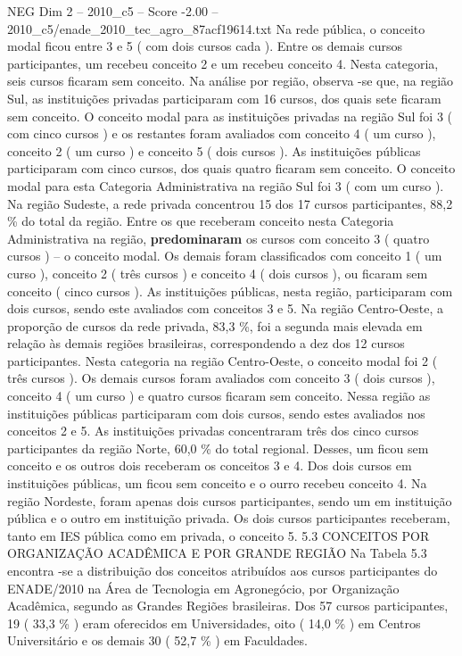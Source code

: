 \begin{textsample}{NEG Dim 2 – 2010\_c5 – Score -2.00 – 2010\_c5/enade\_2010\_tec\_agro\_87acf19614.txt}
Na rede pública, o conceito modal ficou entre 3 e 5 ( com dois cursos cada ).
Entre os demais cursos participantes, um recebeu conceito 2 e um recebeu conceito 4.
Nesta categoria, seis cursos ficaram sem conceito.
Na análise por região, observa -se que, na região Sul, as instituições privadas participaram com 16 cursos, dos quais sete ficaram sem conceito.
O conceito modal para as instituições privadas na região Sul foi 3 ( com cinco cursos ) e os restantes foram avaliados com conceito 4 ( um curso ), conceito 2 ( um curso ) e conceito 5 ( dois cursos ).
As instituições públicas participaram com cinco cursos, dos quais quatro ficaram sem conceito.
O conceito modal para esta Categoria Administrativa na região Sul foi 3 ( com um curso ).
Na região Sudeste, a rede privada concentrou 15 dos 17 cursos participantes, 88,2 \% do total da região.
Entre os que receberam conceito nesta Categoria Administrativa na região, \textbf{predominaram} os cursos com conceito 3 ( quatro cursos ) – o conceito modal.
Os demais foram classificados com conceito 1 ( um curso ), conceito 2 ( três cursos ) e conceito 4 ( dois cursos ), ou ficaram sem conceito ( cinco cursos ).
As instituições públicas, nesta região, participaram com dois cursos, sendo este avaliados com conceitos 3 e 5.
Na região Centro-Oeste, a proporção de cursos da rede privada, 83,3 \%, foi a segunda mais elevada em relação às demais regiões brasileiras, correspondendo a dez dos 12 cursos participantes.
Nesta categoria na região Centro-Oeste, o conceito modal foi 2 ( três cursos ).
Os demais cursos foram avaliados com conceito 3 ( dois cursos ), conceito 4 ( um curso ) e quatro cursos ficaram sem conceito.
Nessa região as instituições públicas participaram com dois cursos, sendo estes avaliados nos conceitos 2 e 5.
As instituições privadas concentraram três dos cinco cursos participantes da região Norte, 60,0 \% do total regional.
Desses, um ficou sem conceito e os outros dois receberam os conceitos 3 e 4.
Dos dois cursos em instituições públicas, um ficou sem conceito e o ourro recebeu conceito 4.
Na região Nordeste, foram apenas dois cursos participantes, sendo um em instituição pública e o outro em instituição privada.
Os dois cursos participantes receberam, tanto em IES pública como em privada, o conceito 5. 5.3 CONCEITOS POR ORGANIZAÇÃO ACADÊMICA E POR GRANDE REGIÃO Na Tabela 5.3 encontra -se a distribuição dos conceitos atribuídos aos cursos participantes do ENADE/2010 na Área de Tecnologia em Agronegócio, por Organização Acadêmica, segundo as Grandes Regiões brasileiras.
Dos 57 cursos participantes, 19 ( 33,3 \% ) eram oferecidos em Universidades, oito ( 14,0 \% ) em Centros Universitário e os demais 30 ( 52,7 \% ) em Faculdades.

\end{textsample}
